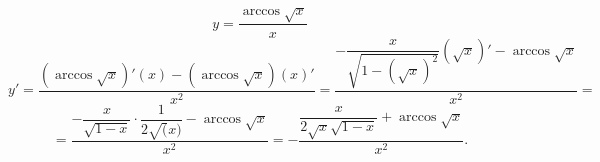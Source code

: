 {}

$$
  y = \dfrac{\arccos\sqrt{x}}{x}
$$
$$
  y' = \dfrac{(\arccos\sqrt{x})'(x)-(\arccos\sqrt{x})(x)'}{x^2}
     = \dfrac{-\dfrac{x}{\sqrt{1-(\sqrt{x})^2}}(\sqrt{x})'-\arccos\sqrt{x}}{x^2} =
$$
$$
    = \dfrac{-\dfrac{x}{\sqrt{1-x}}\cdot\dfrac{1}{2\sqrt(x)}-\arccos\sqrt{x}}{x^2}
     = - \dfrac{\dfrac{x}{2\sqrt{x}\sqrt{1-x}}+\arccos\sqrt{x}}{x^2}.
$$
